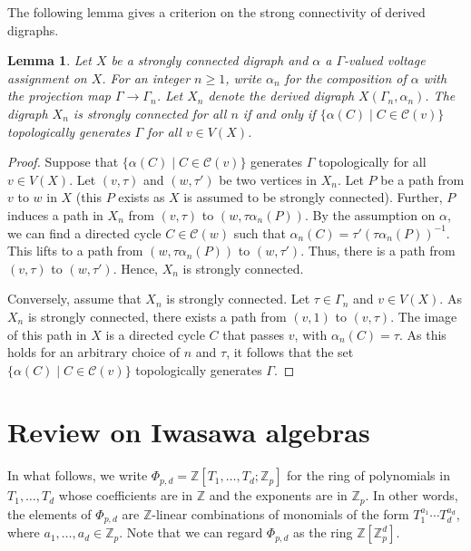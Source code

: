 \documentclass[11pt]{amsart}
\newtheorem{lemma}[theorem]{Lemma}
\numberwithin{equation}{section}
\theoremstyle{remark}
\newcommand{\?}{\stackrel{?}{=}}
\newcommand{\ZZ}{\mathbb{Z}}
\newcommand{\Zp}{\mathbb{Z}_p}
\newcommand{\cC}{\mathcal{C}}
\newcommand{\Z}{\mathbb{Z}}
\begin{document}
The following lemma gives a criterion on the strong connectivity of derived digraphs.
\begin{lemma}\label{lem:connected}
Let $X$ be a strongly connected digraph and $\alpha$ a $\Gamma$-valued voltage assignment on $X$. For an integer $n\ge1$, write $\alpha_n$ for the composition of $\alpha$ with the projection map $\Gamma\to\Gamma_n$. Let $X_n$ denote the derived digraph $X(\Gamma_n,\alpha_n)$. The digraph $X_n$ is strongly connected  for all $n$ if and only if $\{\alpha(C)\mid C\in \cC(v)\}$ topologically generates $\Gamma$ for all $v\in V(X)$.
\end{lemma}
\begin{proof}
Suppose that $\{\alpha(C)\mid C\in \cC(v)\}$ generates $\Gamma$ topologically for all $v\in V(X)$.
    Let $(v,\tau)$ and $(w,\tau')$ be two vertices in $X_n$. Let $P$ be  a path from $v$ to $w$ in $X$ (this $P$ exists as $X$ is assumed to be strongly connected). Further, $P$ induces a path in $X_n$ from $(v,\tau)$ to $(w,\tau \alpha_n(P))$. By the assumption on $\alpha$, we can find a directed cycle $C\in \cC(w)$ such that $\alpha_n(C)=\tau'(\tau\alpha_n(P))^{-1}$. This lifts to a path from $(w,\tau\alpha_n(P))$ to $(w,\tau')$. Thus, there is a path from $(v,\tau)$ to $(w,\tau')$. Hence, $X_n$ is strongly connected.

    Conversely, assume that $X_n$ is strongly connected. Let $\tau\in \Gamma_n$ and $v\in V(X)$. As $X_n$ is strongly connected, there exists a path from $(v,1)$ to $(v,\tau)$. The image of this path in $X$ is a directed cycle $C$ that passes $v$, with $\alpha_n(C)=\tau$. As this holds for an arbitrary choice of $n$ and $\tau$, it follows that the set $\{\alpha(C)\mid C\in \cC(v)\}$ topologically generates $\Gamma$.
\end{proof}




\section{Review on Iwasawa algebras}\label{sec:IwAlg}
In what follows, we write $\Phi_{p,d}=\ZZ[T_1,\ldots,T_d;\Zp]$ for the ring of polynomials in $T_1,\ldots,T_d$ whose coefficients are in $\Z$ and the exponents are in $\Zp$. In other words, the elements of $\Phi_{p,d}$ are $\ZZ$-linear combinations of monomials of the form
$T_1^{a_1}\cdots T_d^{a_d}$, where $a_{1},\ldots,a_{d} \in \mathbb{Z}_{p}$. Note that we can regard $\Phi_{p,d}$ as the ring $\mathbb{Z}[\mathbb{Z}_{p}^{d}]$.
\end{document}
